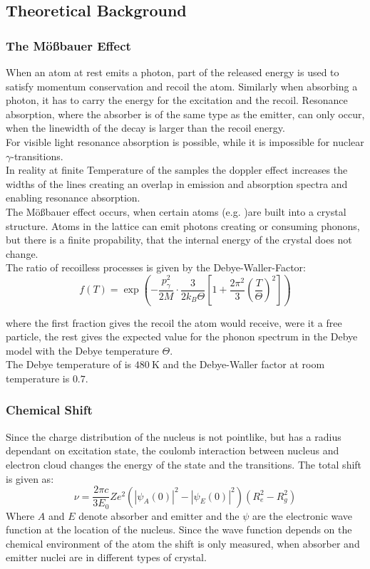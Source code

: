 
\subsection{Theoretical Background}

\subsubsection{The Mößbauer Effect}
When an atom at rest emits a photon, part of the released energy is used to satisfy momentum conservation and recoil the atom.
Similarly when absorbing a photon, it has to carry the energy for the excitation and the recoil.
Resonance absorption, where the absorber is of the same type as the emitter, can only occur, when the linewidth of the decay is larger than the recoil energy.\\

For visible light resonance absorption is possible, while it is impossible for nuclear $\gamma$-transitions.\\

In reality at finite Temperature of the samples the doppler effect increases the widths of the lines creating an overlap in emission and absorption spectra and enabling resonance absorption.\\

The Mößbauer effect occurs, when certain atoms (e.g. )are built into a crystal structure. Atoms in the lattice can emit photons creating or consuming phonons, but there is a finite propability, that the internal energy of the crystal does not change.\\

The ratio of recoilless processes is given by the Debye-Waller-Factor:
$$ f(T) = \exp( - \frac{p_\gamma^2}{2 M} \cdot \frac{3}{2k_B \Theta} [ 1 + \frac{2\pi^2}{3} (\frac{T}{\Theta})^2])$$

where the first fraction gives the recoil the atom would receive, were it a free particle, the rest gives the expected value for the phonon spectrum in the Debye model with the Debye temperature $\Theta$.\\
The Debye temperature of  is $480 \ \text{K}$ and the Debye-Waller factor at room temperature is $0.7$.\\
\subsubsection{Chemical Shift}
Since the charge distribution of the nucleus is not pointlike, but has a radius dependant on excitation state, the coulomb interaction between nucleus and electron cloud changes the energy of the state and the transitions. The total shift is given as:
$$\nu = \frac{2\pi c}{3E_0} Ze^2 (|\psi_A(0)|^2 - |\psi_E(0)|^2)(R_e^2 - R_g^2)$$
Where $A$ and $E$ denote absorber and emitter and the $\psi$ are the electronic wave function at the location of the nucleus. Since the wave function depends on the chemical environment of the atom the shift is only measured, when absorber and emitter nuclei are in different types of crystal.

